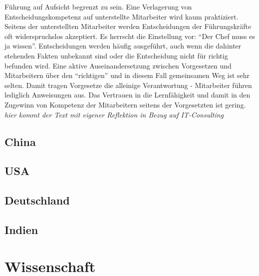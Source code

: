 	Führung auf Aufsicht begrenzt zu sein. Eine Verlagerung von Entscheidungskompetenz 
	auf unterstellte Mitarbeiter wird kaum praktiziert. 
	Seitens der unterstellten Mitarbeiter werden Entscheidungen der Führungskräfte oft 
	widerspruchslos akzeptiert. Es herrscht die Einstellung vor: “Der Chef muss es ja wissen”. Entscheidungen werden häufig ausgeführt, auch wenn die dahinter stehenden Fakten 
	unbekannt sind oder die Entscheidung nicht für richtig befunden wird. Eine aktive 
	Auseinandersetzung zwischen Vorgesetzen und Mitarbeitern über den “richtigen” und in 
	diesem Fall gemeinsamen Weg ist sehr selten. Damit tragen Vorgesetze die alleinige 
	Verantwortung - Mitarbeiter führen lediglich Anweisungen aus. Das Vertrauen in die 
	Lernfähigkeit und damit in den Zugewinn von Kompetenz der Mitarbeitern seitens der 
	Vorgesetzten ist gering. 
	\textit{hier kommt der Text mit eigener Reflektion in Bezug auf IT-Consulting}
	 

	\subsection{China}
	
	
	\subsection{USA}
	
	
	\subsection{Deutschland}
	
	
	\subsection{Indien}


\section{Wissenschaft}